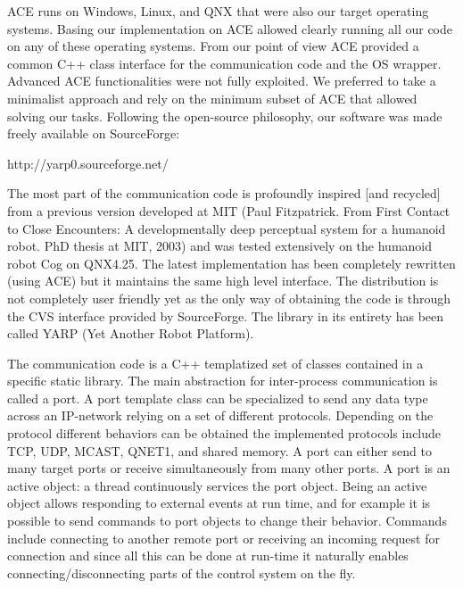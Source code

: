 ACE runs on Windows, Linux, and QNX that were also our target
operating systems. Basing our implementation on ACE allowed clearly
running all our code on any of these operating systems. From our point
of view ACE provided a common C++ class interface for the
communication code and the OS wrapper. Advanced ACE functionalities
were not fully exploited. We preferred to take a minimalist approach
and rely on the minimum subset of ACE that allowed solving our
tasks. Following the open-source philosophy, our software was made
freely available on SourceForge:

http://yarp0.sourceforge.net/

The most part of the communication code is profoundly inspired [and
recycled] from a previous version developed at MIT (Paul
Fitzpatrick. From First Contact to Close Encounters: A developmentally
deep perceptual system for a humanoid robot. PhD thesis at MIT, 2003)
and was tested extensively on the humanoid robot Cog on QNX4.25. The
latest implementation has been completely rewritten (using ACE) but it
maintains the same high level interface. The distribution is not
completely user friendly yet as the only way of obtaining the code is
through the CVS interface provided by SourceForge. The library in its
entirety has been called YARP (Yet Another Robot Platform).

The communication code is a C++ templatized set of classes contained
in a specific static library. The main abstraction for inter-process
communication is called a port. A port template class can be
specialized to send any data type across an IP-network relying on a
set of different protocols. Depending on the protocol different
behaviors can be obtained the implemented protocols include TCP, UDP,
MCAST, QNET1, and shared memory. A port can either send to many target
ports or receive simultaneously from many other ports. A port is an
active object: a thread continuously services the port object. Being
an active object allows responding to external events at run time, and
for example it is possible to send commands to port objects to change
their behavior. Commands include connecting to another remote port or
receiving an incoming request for connection and since all this can be
done at run-time it naturally enables connecting/disconnecting parts
of the control system on the fly.


